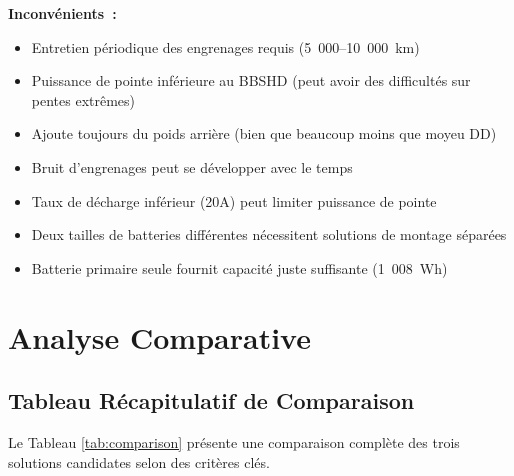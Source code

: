 \documentclass[12pt,a4paper]{article}
\begin{document}
\textbf{Inconvénients~:}
\begin{itemize}
    \item Entretien périodique des engrenages requis (5~000--10~000~km)
    \item Puissance de pointe inférieure au BBSHD (peut avoir des difficultés sur pentes extrêmes)
    \item Ajoute toujours du poids arrière (bien que beaucoup moins que moyeu DD)
    \item Bruit d'engrenages peut se développer avec le temps
    \item Taux de décharge inférieur (20A) peut limiter puissance de pointe
    \item Deux tailles de batteries différentes nécessitent solutions de montage séparées
    \item Batterie primaire seule fournit capacité juste suffisante (1~008~Wh)
\end{itemize}

\section{Analyse Comparative}

\subsection{Tableau Récapitulatif de Comparaison}

Le Tableau \ref{tab:comparison} présente une comparaison complète des trois solutions candidates selon des critères clés.
\end{document}
